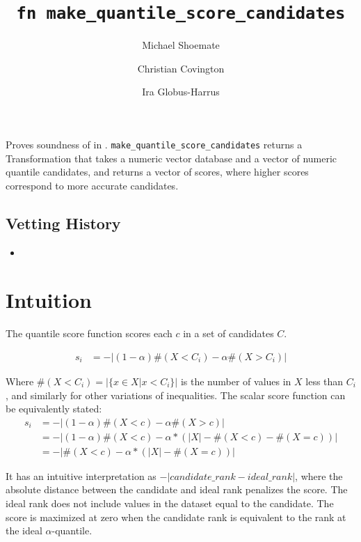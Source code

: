 \documentclass{article}
\title{\texttt{fn make\_quantile\_score\_candidates}}
\author{Michael Shoemate \and Christian Covington \and Ira Globus-Harrus}
\begin{document}
\maketitle  


\contrib

Proves soundness of  
in .
\texttt{make\_quantile\_score\_candidates} returns a Transformation that 
takes a numeric vector database and a vector of numeric quantile candidates,
and returns a vector of scores, where higher scores correspond to more accurate candidates.

\subsection*{Vetting History}
\begin{itemize}
    \item {}
\end{itemize}

\section{Intuition}
The quantile score function scores each $c$ in a set of candidates $C$.

\begin{equation}
\begin{array}{rl}
    s_i &= -|(1 - \alpha) \#(X < C_i) - \alpha \#(X > C_i)|
\end{array}
\end{equation}

Where $\#(X < C_i) = |\{x \in X | x < C_i\}|$ is the number of values in $X$ less than $C_i$, 
and similarly for other variations of inequalities.
The scalar score function can be equivalently stated:
\begin{align}
    s_i &= -|(1 - \alpha) \#(X < c) - \alpha \#(X > c)| \\
    &= -|(1 - \alpha) \#(X < c) - \alpha * (|X| - \#(X < c) - \#(X = c))| \\
    &= -|\#(X < c) - \alpha * (|X| - \#(X = c))|
\end{align}

It has an intuitive interpretation as $-|candidate\_rank - ideal\_rank|$, 
where the absolute distance between the candidate and ideal rank penalizes the score.
The ideal rank does not include values in the dataset equal to the candidate.
The score is maximized at zero when the candidate rank is equivalent to the rank at the ideal $\alpha$-quantile.
\end{document}
